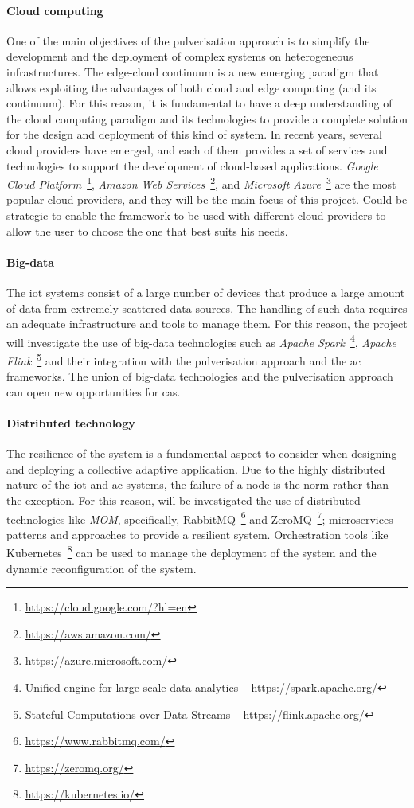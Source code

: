 \documentclass[12pt]{article}
\newcommand{\meta}[1]{{\color{blue}#1}}
\begin{document}
\meta{
\paragraph{Cloud computing}
One of the main objectives of the pulverisation approach is to simplify the development
and the deployment of complex systems on heterogeneous infrastructures.
%
The edge-cloud continuum is a new emerging paradigm that allows exploiting the
advantages of both cloud and edge computing (and its continuum).
%
For this reason, it is fundamental to have a deep understanding of the cloud computing
paradigm and its technologies to provide a complete solution for the design and deployment
of this kind of system.
%
In recent years, several cloud providers have emerged, and each of them provides
a set of services and technologies to support the development of cloud-based applications.
%
\emph{Google Cloud Platform}~\footnote{\url{https://cloud.google.com/?hl=en}},
\emph{Amazon Web Services}~\footnote{\url{https://aws.amazon.com/}},
and \emph{Microsoft Azure}~\footnote{\url{https://azure.microsoft.com/}}
are the most popular cloud providers, and they will be the main focus of this project.
%
Could be strategic to enable the framework to be used with different cloud providers
to allow the user to choose the one that best suits his needs.

\todo{IaaS tools and orchestration tools}


\paragraph{Big-data}
The \ac{iot} systems consist of a large number of devices that produce a large amount of data
from extremely scattered data sources.
%
The handling of such data requires an adequate infrastructure and tools to manage them.
%
For this reason, the project will investigate the use of big-data technologies
such as \emph{Apache Spark}~\footnote{Unified engine for large-scale data analytics -- \url{https://spark.apache.org/}},
\emph{Apache Flink}~\footnote{Stateful Computations over Data Streams -- \url{https://flink.apache.org/}} and their integration with the pulverisation approach and the \ac{ac} frameworks.
%
The union of big-data technologies and the pulverisation approach can open new opportunities for \ac{cas}.

\paragraph{Distributed technology}
The resilience of the system is a fundamental aspect to consider when designing
and deploying a collective adaptive application.
%
Due to the highly distributed nature of the \ac{iot} and \ac{ac} systems,
the failure of a node is the norm rather than the exception.
%
For this reason, will be investigated the use of distributed technologies like \emph{MOM},
specifically, RabbitMQ~\footnote{\url{https://www.rabbitmq.com/}} and ZeroMQ~\footnote{\url{https://zeromq.org/}};
microservices patterns and approaches to provide a resilient system.
%
Orchestration tools like Kubernetes~\footnote{\url{https://kubernetes.io/}} can be used to manage the deployment of the system
and the dynamic reconfiguration of the system.
}
\end{document}
